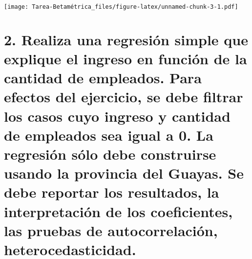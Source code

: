 \documentclass[
]{article}
\begin{document}
\texttt{[image: Tarea-Betamétrica\_files/figure-latex/unnamed-chunk-3-1.pdf]}

\hypertarget{realiza-una-regresiuxf3n-simple-que-explique-el-ingreso-en-funciuxf3n-de-la-cantidad-de-empleados.-para-efectos-del-ejercicio-se-debe-filtrar-los-casos-cuyo-ingreso-y-cantidad-de-empleados-sea-igual-a-0.-la-regresiuxf3n-suxf3lo-debe-construirse-usando-la-provincia-del-guayas.-se-debe-reportar-los-resultados-la-interpretaciuxf3n-de-los-coeficientes-las-pruebas-de-autocorrelaciuxf3n-heterocedasticidad.}{%
\section{2. Realiza una regresión simple que explique el ingreso en
función de la cantidad de empleados. Para efectos del ejercicio, se debe
filtrar los casos cuyo ingreso y cantidad de empleados sea igual a 0. La
regresión sólo debe construirse usando la provincia del Guayas. Se debe
reportar los resultados, la interpretación de los coeficientes, las
pruebas de autocorrelación,
heterocedasticidad.}\label{realiza-una-regresiuxf3n-simple-que-explique-el-ingreso-en-funciuxf3n-de-la-cantidad-de-empleados.-para-efectos-del-ejercicio-se-debe-filtrar-los-casos-cuyo-ingreso-y-cantidad-de-empleados-sea-igual-a-0.-la-regresiuxf3n-suxf3lo-debe-construirse-usando-la-provincia-del-guayas.-se-debe-reportar-los-resultados-la-interpretaciuxf3n-de-los-coeficientes-las-pruebas-de-autocorrelaciuxf3n-heterocedasticidad.}}
\end{document}
